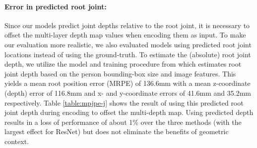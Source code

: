 \documentclass[times,referee,twocolumn,final,authoryear]{elsarticle}
\begin{document}
\paragraph{Error in predicted root joint:} 
Since our models predict joint depths relative to the root joint, it is necessary to offset the
multi-layer depth map values when encoding them as input. To make our evaluation more realistic, 
we also evaluated models using predicted root joint locations instead of using the ground-truth.
To estimate the (absolute) root joint depth, we utilize the model and training procedure
from \cite{rootnet} which estimates root joint depth based on the person bounding-box size
and image features.  This yields a mean root position error (MRPE) of 136.6mm with a mean
z-coordinate (depth) error of 116.8mm and x- and y-coordinate errors of 41.6mm and 35.2mm respectively.  Table \ref{table:mpjpe-j} shows the result of using this predicted root joint 
depth during encoding to offset the multi-depth map. Using predicted depth results in a 
loss of performance of about 1\% over the three methods (with the largest effect for ResNet)
but does not eliminate the benefits of geometric context.
\end{document}
